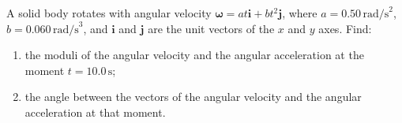 
\item A solid body rotates with angular velocity $\boldsymbol{\omega} = at\mathbf{i} + bt^2\mathbf{j}$, where $a = 0.50 \, \text{rad/s}^2$, $b = 0.060 \, \text{rad/s}^3$, and $\mathbf{i}$ and $\mathbf{j}$ are the unit vectors of the $x$ and $y$ axes. Find:
    \begin{enumerate}
        \item the moduli of the angular velocity and the angular acceleration at the moment $t = 10.0 \, \text{s}$;
        \item the angle between the vectors of the angular velocity and the angular acceleration at that moment.
    \end{enumerate}
